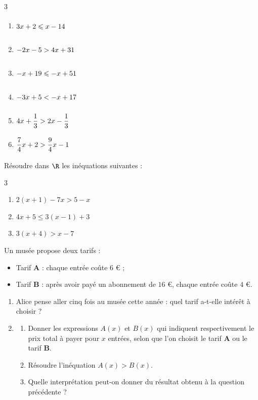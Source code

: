 \vspace{-8pt}
\setlength{\columnsep}{1cm}
\setlength{\columnseprule}{0pt}
\begin{multicols}{3}
\begin{enumerate}
\item $3x+2\leqslant x-14\vphantom{\dfrac{h}{p}}$
\smallskip
\item $-2x-5>4x+31\vphantom{\dfrac{h}{p}}$
\smallskip
\item $-x+19\leqslant -x+51\vphantom{\dfrac{h}{p}}$
\smallskip
\item $-3x+5<-x+17\vphantom{\dfrac{h}{p}}$
\smallskip
\item $4x+\dfrac{1}{3}>2x-\dfrac{1}{3}\vphantom{\dfrac{h}{p}}$
\smallskip
\item $\dfrac{7}{4}x+2>\dfrac{9}{4}x-1\vphantom{\dfrac{h}{p}}$
\end{enumerate}
\end{multicols}

\exo

Résoudre dans $\R$ les inéquations suivantes :

\vspace{-8pt}
\setlength{\columnsep}{1cm}
\setlength{\columnseprule}{0pt}
\begin{multicols}{3}
\begin{enumerate}
\item $2(x+1)-7x>5-x$
\item $4x+5\leqslant 3(x-1)+3$
\item $3(x+4)>x-7$
\end{enumerate}
\end{multicols}

\exo

Un musée propose deux tarifs :
\begin{itemize}
\item Tarif \textbf{A} : chaque entrée coûte $6$ \euro{} ;
\item Tarif \textbf{B} : après avoir payé un abonnement de $16$ \euro{}, chaque entrée coûte $4$ \euro{}.
\end{itemize}
\begin{enumerate}
\item Alice pense aller cinq fois au musée cette année : quel tarif a-t-elle intérêt à choisir ?
\item
\begin{enumerate}
\item Donner les expressions $A(x)$ et $B(x)$ qui indiquent respectivement le prix total à payer pour $x$ entrées, selon que l'on choisit le tarif \textbf{A} ou le tarif \textbf{B}.
\item Résoudre l'inéquation $A(x)>B(x)$.
\item Quelle interprétation peut-on donner du résultat obtenu à la question précédente ?
\end{enumerate}
\end{enumerate}

